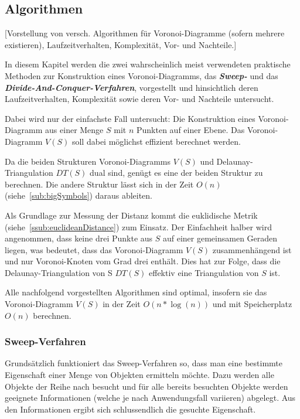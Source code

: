 \subsection{Algorithmen}
\label{sub:voronoiAlgorithms}
[Vorstellung von versch. Algorithmen für Voronoi-Diagramme (sofern mehrere existieren), Laufzeitverhalten, Komplexität, Vor- und Nachteile.]

In diesem Kapitel werden die zwei wahrscheinlich meist verwendeten praktische Methoden zur Konstruktion eines Voronoi-Diagramms, das \textit{\textbf{Sweep-}} und das \textit{\textbf{Divide-And-Conquer-Verfahren}}, vorgestellt und hinsichtlich deren Laufzeitverhalten, Komplexität sowie deren Vor- und Nachteile untersucht.

Dabei wird nur der einfachste Fall untersucht: Die Konstruktion eines Voronoi-Diagramm aus einer Menge $S$ mit $n$ Punkten auf einer Ebene. Das Voronoi-Diagramm $V(S)$ soll dabei möglichst effizient berechnet werden.

Da die beiden Strukturen Voronoi-Diagramms $V(S)$ und Delaunay-Triangulation $DT(S)$ dual sind, genügt es eine der beiden Struktur zu berechnen. Die andere Struktur lässt
sich in der Zeit $O(n)$ (siehe~\ref{sub:bigSymbols}) daraus ableiten.

Als Grundlage zur Messung der Distanz kommt die euklidische Metrik (siehe~\ref{ssub:euclideanDistance}) zum Einsatz. Der Einfachheit halber wird angenommen, dass keine drei Punkte aus $S$ auf einer gemeinsamen Geraden liegen, was bedeutet, dass das Voronoi-Diagramm $V(S)$ zusammenhängend ist und nur Voronoi-Knoten vom Grad drei enthält. Dies hat zur Folge, dass die Delaunay-Triangulation von S $DT(S)$ effektiv eine Triangulation von $S$ ist.

Alle nachfolgend vorgestellten Algorithmen sind optimal, insofern sie das Voronoi-Diagramm $V(S)$ in der Zeit $O(n * \log(n))$ und mit Speicherplatz $O(n)$ berechnen.

\subsubsection{Sweep-Verfahren}
\label{ssub:voronoiAlgorithmsSweep}
Grundsätzlich funktioniert das Sweep-Verfahren so, dass man eine bestimmte Eigenschaft einer Menge von Objekten ermitteln möchte. Dazu werden alle Objekte der Reihe nach besucht und für alle bereits besuchten Objekte werden geeignete Informationen (welche je nach Anwendungsfall variieren) abgelegt. Aus den Informationen ergibt sich schlussendlich die gesuchte Eigenschaft.

